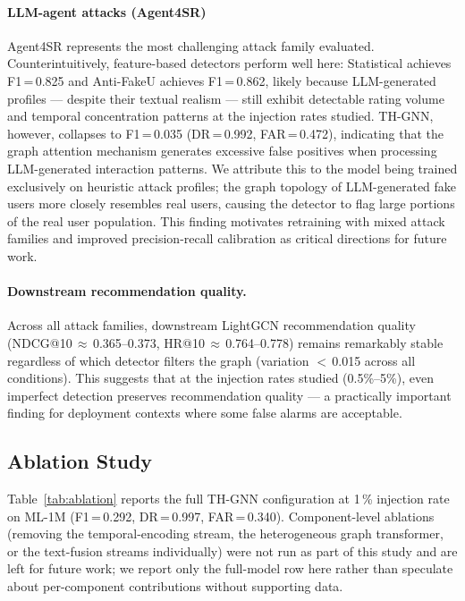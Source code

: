 \paragraph{LLM-agent attacks (Agent4SR)}
Agent4SR represents the most challenging attack family evaluated. Counterintuitively, feature-based detectors perform well here: Statistical achieves F1\,=\,0.825 and Anti-FakeU achieves F1\,=\,0.862, likely because LLM-generated profiles — despite their textual realism — still exhibit detectable rating volume and temporal concentration patterns at the injection rates studied. TH-GNN, however, collapses to F1\,=\,0.035 (DR\,=\,0.992, FAR\,=\,0.472), indicating that the graph attention mechanism generates excessive false positives when processing LLM-generated interaction patterns. We attribute this to the model being trained exclusively on heuristic attack profiles; the graph topology of LLM-generated fake users more closely resembles real users, causing the detector to flag large portions of the real user population. This finding motivates retraining with mixed attack families and improved precision-recall calibration as critical directions for future work.

\paragraph{Downstream recommendation quality.}
Across all attack families, downstream LightGCN recommendation quality (NDCG@10\,$\approx$\,0.365--0.373, HR@10\,$\approx$\,0.764--0.778) remains remarkably stable regardless of which detector filters the graph (variation $<$\,0.015 across all conditions). This suggests that at the injection rates studied (0.5\%–5\%), even imperfect detection preserves recommendation quality — a practically important finding for deployment contexts where some false alarms are acceptable.

\subsection{Ablation Study}
\label{sec:ablation}



Table~\ref{tab:ablation} reports the full TH-GNN configuration at 1\,\%
injection rate on ML-1M (F1\,=\,0.292, DR\,=\,0.997, FAR\,=\,0.340).
Component-level ablations (removing the temporal-encoding stream, the
heterogeneous graph transformer, or the text-fusion streams individually)
were not run as part of this study and are left for future work; we
report only the full-model row here rather than speculate about
per-component contributions without supporting data.

